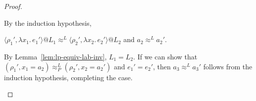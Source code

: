 \documentclass{article}
\makeatletter
\newcommand{\at}{\ensuremath{{\scriptstyle{@}}}}
\theoremstyle{definition}
\makeatother
\begin{document}
\begin{proof}
\begin{description}
    By the induction hypothesis,
    \begin{description}
    \item 
      $\langle{\rho_1', \lambda{x_1}.\, e_1'\rangle} \at L_1
      \approx^{L}
      \langle{\rho_2', \lambda{x_2}.\, e_2'\rangle} \at L_2$
      \quad and \quad
      $a_2 \approx^{L} a_2'$.
    \end{description}
    By Lemma~\ref{lem:lp-equiv-lab-inv}, $L_1 = L_2$.
    If we can show that
    $(\rho_1', x_1 = a_2) \approx^{L}_{P} (\rho_2', x_2 = a_2')$
    and $e_1' = e_2'$, then
    $a_3 \approx^{L} a_3'$ follows from the induction hypothesis,
    completing the case.
    \qedhere
  \end{description}
\end{proof}
\end{document}
